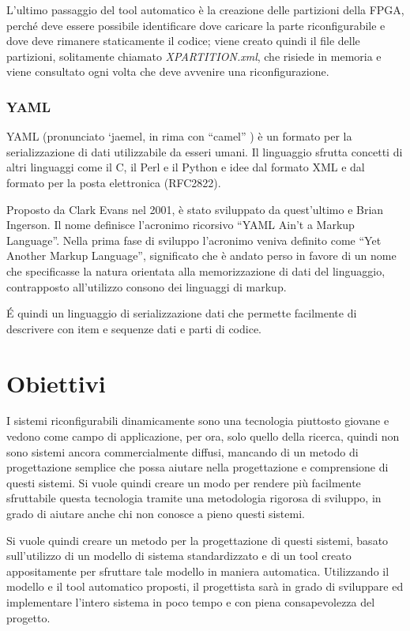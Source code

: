 \documentclass[a4paper,titlepage]{book}
\begin{document}
L'ultimo passaggio del tool automatico è la creazione delle partizioni della FPGA, perché deve essere possibile identificare dove caricare la parte riconfigurabile e dove deve rimanere staticamente il codice; viene creato quindi il file delle partizioni, solitamente chiamato \textit{XPARTITION.xml}, che risiede in memoria e viene consultato ogni volta che deve avvenire una riconfigurazione.

\subsection{YAML}
YAML (pronunciato  `jaemel, in rima con ``camel'' ) è un formato per la serializzazione di dati utilizzabile da esseri umani. Il linguaggio sfrutta concetti di altri linguaggi come il C, il Perl e il Python e idee dal formato XML e dal formato per la posta elettronica (RFC2822).

Proposto da Clark Evans nel 2001, è stato sviluppato da quest'ultimo e Brian Ingerson. Il nome definisce l'acronimo ricorsivo ``YAML Ain't a Markup Language''. Nella prima fase di sviluppo l'acronimo veniva definito come ``Yet Another Markup Language'', significato che è andato perso in favore di un nome che specificasse la natura orientata alla memorizzazione di dati del linguaggio, contrapposto all'utilizzo consono dei linguaggi di markup.

\'{E} quindi un linguaggio di serializzazione dati che permette facilmente di descrivere con item e sequenze dati e parti di codice.

\chapter{Obiettivi}

I sistemi riconfigurabili dinamicamente sono una tecnologia piuttosto giovane e vedono come campo di applicazione, per ora, solo quello della ricerca, quindi non sono sistemi ancora commercialmente diffusi, mancando di un metodo di progettazione semplice che possa aiutare nella progettazione e comprensione di questi sistemi. Si vuole quindi creare un modo per rendere più facilmente sfruttabile questa tecnologia tramite una metodologia rigorosa di sviluppo, in grado di aiutare anche chi non conosce a pieno questi sistemi.

Si vuole quindi creare un metodo per la progettazione di questi sistemi, basato sull'utilizzo di un modello di sistema standardizzato e di un tool creato appositamente per sfruttare tale modello in maniera automatica. Utilizzando il modello e il tool automatico proposti, il progettista sarà in grado di sviluppare ed implementare l'intero sistema in poco tempo e con piena consapevolezza del progetto.
\end{document}
